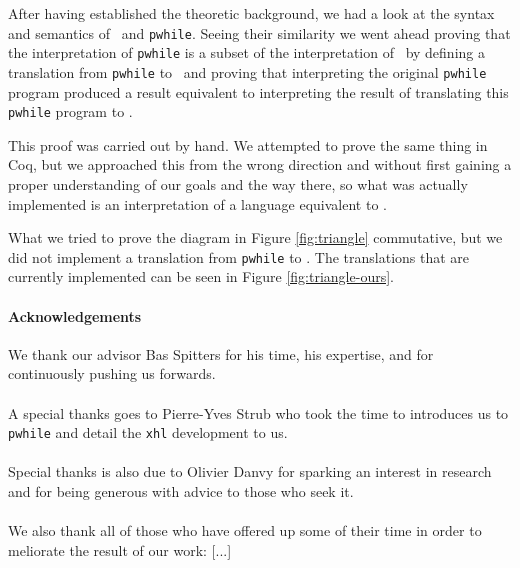 \documentclass[11pt, leqno, titlepage]{article}
\theoremstyle{definition}
\begin{document}
After having established the theoretic background, we had a look at the syntax and
semantics of \rml\ and \texttt{pwhile}. Seeing their similarity we went ahead proving
that the interpretation of \texttt{pwhile} is a subset of the interpretation of
\rml\ by defining a translation from \texttt{pwhile} to \rml\ and proving that
interpreting the original \texttt{pwhile} program produced a result equivalent to
interpreting the result of translating this \texttt{pwhile} program to \rml.

This proof was carried out by hand. We attempted to prove the same thing in Coq, but
we approached this from the wrong direction and without first gaining a proper
understanding of our goals and the way there, so what was actually implemented is an
interpretation of a language equivalent to \rml.

What we tried to prove the diagram in Figure \ref{fig:triangle} commutative, but we
did not implement a translation from \texttt{pwhile} to \rml. The translations that
are currently implemented can be seen in Figure \ref{fig:triangle-ours}. 


\paragraph{Acknowledgements}We thank our advisor Bas Spitters for his time, his
expertise, and for continuously pushing us forwards.
\\ \\
A special thanks goes to Pierre-Yves Strub who took the time to introduces us to
\texttt{pwhile} and detail the \texttt{xhl} development to us.
\\ \\
Special thanks is also due to Olivier Danvy for sparking an interest in research and
for being generous with advice to those who seek it. 
\\ \\
We also thank all of those who have offered up some of their time in order to
meliorate the result of our work: [...]  

\newpage


\end{document}
